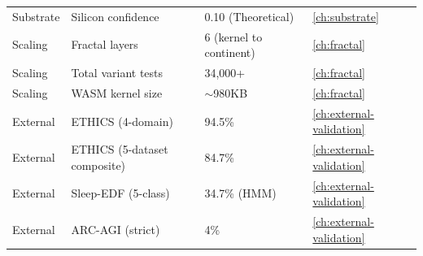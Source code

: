 \documentclass[12pt]{book}
\begin{document}
\begin{longtable}{p{3.5cm}p{4cm}p{3.5cm}l}
Substrate & Silicon confidence & 0.10 (Theoretical) & \ref{ch:substrate} \\
Scaling & Fractal layers & 6 (kernel to continent) & \ref{ch:fractal} \\
Scaling & Total variant tests & 34,000+ & \ref{ch:fractal} \\
Scaling & WASM kernel size & ${\sim}$980KB & \ref{ch:fractal} \\
\addlinespace
External & ETHICS (4-domain) & 94.5\% & \ref{ch:external-validation} \\
External & ETHICS (5-dataset composite) & 84.7\% & \ref{ch:external-validation} \\
External & Sleep-EDF (5-class) & 34.7\% (HMM) & \ref{ch:external-validation} \\
External & ARC-AGI (strict) & 4\% & \ref{ch:external-validation} \\
\bottomrule
\end{longtable}

\backmatter
\end{document}
